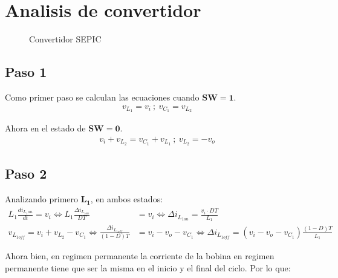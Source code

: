 \section{Analisis de convertidor}
\begin{figure}[h!]
    \centering
    \caption{Convertidor SEPIC}
    \label{fig:circuitio}
\end{figure}

\subsection{Paso 1}
Como primer paso se calculan las ecuaciones cuando $\mathbf{SW=1}$.
\begin{align*}
	v_{L_1}=v_i \ ; \ v_{C_1}=v_{L_2}
\end{align*}

Ahora en el estado de $\mathbf{SW=0}$.
\begin{align*}
	v_i+v_{L_2}=v_{C_1}+v_{L_1} \ ; \ v_{L_2}=-v_o
\end{align*}
\subsection{Paso 2}
Analizando primero $\mathbf{L_1}$, en ambos estados:
\begin{align*}
	L_1  \frac{d i_{L_1on}}{dt}=v_i \iff L_1  \frac{\Delta i_{L_{1on}}}{DT}&=v_i \iff \Delta i_{L_{1on}}=\frac{v_i \cdot DT}{L_1} \\
	v_{L_{1off}}=v_i+v_{L_2}-v_{C_1} \iff \frac{\Delta i_{L_{1off}}}{(1-D)T}&=v_i-v_{o}-v_{C_1} \iff \Delta i_{L_{1off}} =(v_i-v_{o}-v_{C_1})\frac{(1-D)T}{L_1}
\end{align*}

Ahora bien, en regimen permanente la corriente de la bobina en regimen permanente tiene que ser la misma en el inicio y el final del ciclo.
Por lo que:

